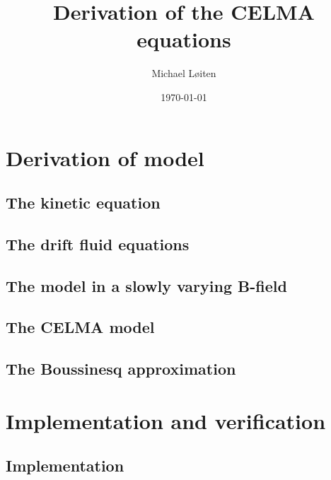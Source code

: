 \documentclass[12pt,a4paper,oneside,openright]{report} %
\title{\vspace{-8ex}Derivation of the CELMA equations\vspace{-1ex}}
\author{Michael L{\o}iten}
\date{\vspace{-2ex}\today}
\begin{document}
\maketitle
%
\part{Derivation of model}
\chapter{The kinetic equation}

%
\chapter{The drift fluid equations}
\label{chap:drift-order}


\chapter{The model in a slowly varying B-field}


\chapter{The CELMA model}
\label{chap:CELMA}






\chapter{The Boussinesq approximation}


\part{Implementation and verification}
\chapter{Implementation}
\label{chap:implementation}







\end{document}
